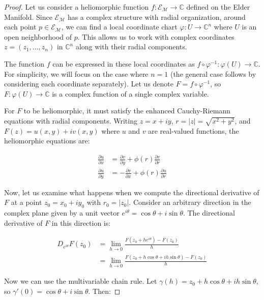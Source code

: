\begin{proof}
Let us consider a heliomorphic function $f: \mathcal{E}_{\mathcal{M}} \rightarrow \mathbb{C}$ defined on the Elder Manifold. Since $\mathcal{E}_{\mathcal{M}}$ has a complex structure with radial organization, around each point $p \in \mathcal{E}_{\mathcal{M}}$, we can find a local coordinate chart $\varphi: U \rightarrow \mathbb{C}^n$ where $U$ is an open neighborhood of $p$. This allows us to work with complex coordinates $z = (z_1, \ldots, z_n)$ in $\mathbb{C}^n$ along with their radial components.

The function $f$ can be expressed in these local coordinates as $f \circ \varphi^{-1}: \varphi(U) \rightarrow \mathbb{C}$. For simplicity, we will focus on the case where $n=1$ (the general case follows by considering each coordinate separately). Let us denote $F = f \circ \varphi^{-1}$, so $F: \varphi(U) \rightarrow \mathbb{C}$ is a complex function of a single complex variable.

For $F$ to be heliomorphic, it must satisfy the enhanced Cauchy-Riemann equations with radial components. Writing $z = x + iy$, $r = |z| = \sqrt{x^2 + y^2}$, and $F(z) = u(x,y) + iv(x,y)$ where $u$ and $v$ are real-valued functions, the heliomorphic equations are:

\begin{align}
\frac{\partial u}{\partial x} &= \frac{\partial v}{\partial y} + \phi(r)\frac{\partial v}{\partial r} \\
\frac{\partial u}{\partial y} &= -\frac{\partial v}{\partial x} + \phi(r)\frac{\partial u}{\partial r}
\end{align}

Now, let us examine what happens when we compute the directional derivative of $F$ at a point $z_0 = x_0 + iy_0$ with $r_0 = |z_0|$. Consider an arbitrary direction in the complex plane given by a unit vector $e^{i\theta} = \cos\theta + i\sin\theta$. The directional derivative of $F$ in this direction is:

\begin{align}
D_{e^{i\theta}}F(z_0) &= \lim_{h \rightarrow 0} \frac{F(z_0 + he^{i\theta}) - F(z_0)}{h} \\
&= \lim_{h \rightarrow 0} \frac{F(z_0 + h\cos\theta + ih\sin\theta) - F(z_0)}{h}
\end{align}

Now we can use the multivariable chain rule. Let $\gamma(h) = z_0 + h\cos\theta + ih\sin\theta$, so $\gamma'(0) = \cos\theta + i\sin\theta$. Then:


\end{proof}

